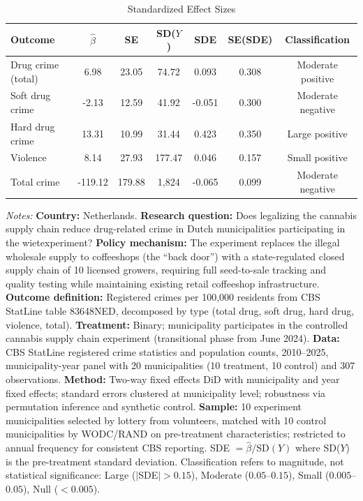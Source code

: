\begin{table}[t]
\centering
\caption{Standardized Effect Sizes}
\label{tab:sde}
\begin{tabular}{lcccccc}
\hline\hline
Outcome & $\hat{\beta}$ & SE & SD($Y$) & SDE & SE(SDE) & Classification \\
\hline
Drug crime (total) & 6.98 & 23.05 & 74.72 & 0.093 & 0.308 & Moderate positive \\
Soft drug crime & -2.13 & 12.59 & 41.92 & -0.051 & 0.300 & Moderate negative \\
Hard drug crime & 13.31 & 10.99 & 31.44 & 0.423 & 0.350 & Large positive \\
Violence & 8.14 & 27.93 & 177.47 & 0.046 & 0.157 & Small positive \\
Total crime & -119.12 & 179.88 & 1,824 & -0.065 & 0.099 & Moderate negative \\
\hline\hline
\end{tabular}
\begin{tablenotes}
\item \textit{Notes:} \textbf{Country:} Netherlands. \textbf{Research question:} Does legalizing the cannabis supply chain reduce drug-related crime in Dutch municipalities participating in the wietexperiment? \textbf{Policy mechanism:} The experiment replaces the illegal wholesale supply to coffeeshops (the ``back door'') with a state-regulated closed supply chain of 10 licensed growers, requiring full seed-to-sale tracking and quality testing while maintaining existing retail coffeeshop infrastructure. \textbf{Outcome definition:} Registered crimes per 100,000 residents from CBS StatLine table 83648NED, decomposed by type (total drug, soft drug, hard drug, violence, total). \textbf{Treatment:} Binary; municipality participates in the controlled cannabis supply chain experiment (transitional phase from June 2024). \textbf{Data:} CBS StatLine registered crime statistics and population counts, 2010--2025, municipality-year panel with 20 municipalities (10 treatment, 10 control) and 307 observations. \textbf{Method:} Two-way fixed effects DiD with municipality and year fixed effects; standard errors clustered at municipality level; robustness via permutation inference and synthetic control. \textbf{Sample:} 10 experiment municipalities selected by lottery from volunteers, matched with 10 control municipalities by WODC/RAND on pre-treatment characteristics; restricted to annual frequency for consistent CBS reporting. SDE $= \hat{\beta} / \text{SD}(Y)$ where SD($Y$) is the pre-treatment standard deviation. Classification refers to magnitude, not statistical significance: Large ($|$SDE$| > 0.15$), Moderate ($0.05$--$0.15$), Small ($0.005$--$0.05$), Null ($< 0.005$).
\end{tablenotes}
\end{table}

